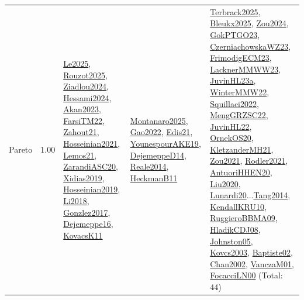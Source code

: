 {\begin{longtable}{p{3cm}r>{\raggedright\arraybackslash}p{6cm}>{\raggedright\arraybackslash}p{6cm}>{\raggedright\arraybackslash}p{8cm}}
\index{Pareto}\index{Concepts!Pareto}Pareto &  1.00 & \hyperref[detail:Le2025]{Le2025}, \hyperref[detail:Rouzot2025]{Rouzot2025}, \hyperref[detail:Ziadlou2024]{Ziadlou2024}, \hyperref[detail:Hessami2024]{Hessami2024}, \hyperref[detail:Akan2023]{Akan2023}, \hyperref[detail:FarsiTM22]{FarsiTM22}, \hyperref[detail:Zahout21]{Zahout21}, \hyperref[detail:Hosseinian2021]{Hosseinian2021}, \hyperref[detail:Lemos21]{Lemos21}, \hyperref[detail:ZarandiASC20]{ZarandiASC20}, \hyperref[detail:Xidias2019]{Xidias2019}, \hyperref[detail:Hosseinian2019]{Hosseinian2019}, \hyperref[detail:Li2018]{Li2018}, \hyperref[detail:Gonzlez2017]{Gonzlez2017}, \hyperref[detail:Dejemeppe16]{Dejemeppe16}, \hyperref[detail:KovacsK11]{KovacsK11} & \hyperref[detail:Montanaro2025]{Montanaro2025}, \hyperref[detail:Gao2022]{Gao2022}, \hyperref[detail:Edis21]{Edis21}, \hyperref[detail:YounespourAKE19]{YounespourAKE19}, \hyperref[detail:DejemeppeD14]{DejemeppeD14}, \hyperref[detail:Reale2014]{Reale2014}, \hyperref[detail:HeckmanB11]{HeckmanB11} & \hyperref[detail:Terbrack2025]{Terbrack2025}, \hyperref[detail:Bleukx2025]{Bleukx2025}, \hyperref[detail:Zou2024]{Zou2024}, \hyperref[detail:GokPTGO23]{GokPTGO23}, \hyperref[detail:CzerniachowskaWZ23]{CzerniachowskaWZ23}, \hyperref[detail:FrimodigECM23]{FrimodigECM23}, \hyperref[detail:LacknerMMWW23]{LacknerMMWW23}, \hyperref[detail:JuvinHL23a]{JuvinHL23a}, \hyperref[detail:WinterMMW22]{WinterMMW22}, \hyperref[detail:Squillaci2022]{Squillaci2022}, \hyperref[detail:MengGRZSC22]{MengGRZSC22}, \hyperref[detail:JuvinHL22]{JuvinHL22}, \hyperref[detail:OrnekOS20]{OrnekOS20}, \hyperref[detail:KletzanderMH21]{KletzanderMH21}, \hyperref[detail:Zou2021]{Zou2021}, \hyperref[detail:Rodler2021]{Rodler2021}, \hyperref[detail:AntuoriHHEN20]{AntuoriHHEN20}, \hyperref[detail:Liu2020]{Liu2020}, \hyperref[detail:Lunardi20]{Lunardi20}...\hyperref[detail:Tang2014]{Tang2014}, \hyperref[detail:KendallKRU10]{KendallKRU10}, \hyperref[detail:RuggieroBBMA09]{RuggieroBBMA09}, \hyperref[detail:HladikCDJ08]{HladikCDJ08}, \hyperref[detail:Johnston05]{Johnston05}, \hyperref[detail:Kovcs2003]{Kovcs2003}, \hyperref[detail:Baptiste02]{Baptiste02}, \hyperref[detail:Chan2002]{Chan2002}, \hyperref[detail:VanczaM01]{VanczaM01}, \hyperref[detail:FocacciLN00]{FocacciLN00} (Total: 44)\\

\end{longtable}}
